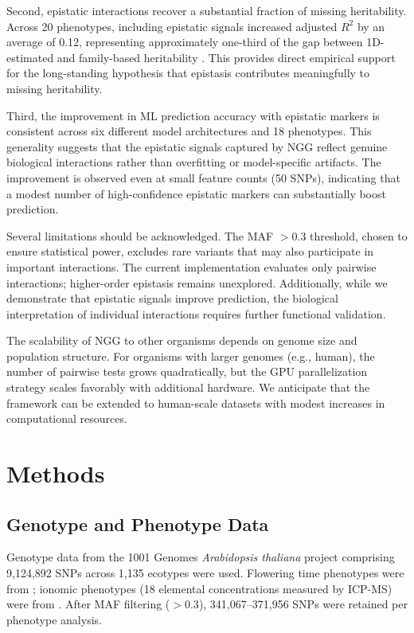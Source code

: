 \documentclass[11pt]{article}
\begin{document}
Second, epistatic interactions recover a substantial fraction of missing heritability. Across 20 phenotypes, including epistatic signals increased adjusted $R^2$ by an average of 0.12, representing approximately one-third of the gap between 1D-estimated and family-based heritability \citep{manolio2009finding, zuk2012mystery}. This provides direct empirical support for the long-standing hypothesis that epistasis contributes meaningfully to missing heritability.

Third, the improvement in ML prediction accuracy with epistatic markers is consistent across six different model architectures and 18 phenotypes. This generality suggests that the epistatic signals captured by NGG reflect genuine biological interactions rather than overfitting or model-specific artifacts. The improvement is observed even at small feature counts (50 SNPs), indicating that a modest number of high-confidence epistatic markers can substantially boost prediction.

Several limitations should be acknowledged. The MAF $> 0.3$ threshold, chosen to ensure statistical power, excludes rare variants that may also participate in important interactions. The current implementation evaluates only pairwise interactions; higher-order epistasis remains unexplored. Additionally, while we demonstrate that epistatic signals improve prediction, the biological interpretation of individual interactions requires further functional validation.

The scalability of NGG to other organisms depends on genome size and population structure. For organisms with larger genomes (e.g., human), the number of pairwise tests grows quadratically, but the GPU parallelization strategy scales favorably with additional hardware. We anticipate that the framework can be extended to human-scale datasets with modest increases in computational resources.

\section{Methods}

\subsection{Genotype and Phenotype Data}

Genotype data from the 1001 Genomes \textit{Arabidopsis thaliana} project \citep{genomes20111001} comprising 9,124,892 SNPs across 1,135 ecotypes were used. Flowering time phenotypes were from \citet{atwell2010genome}; ionomic phenotypes (18 elemental concentrations measured by ICP-MS) were from \citet{campos2021ionomics}. After MAF filtering ($> 0.3$), 341,067--371,956 SNPs were retained per phenotype analysis.
\end{document}
